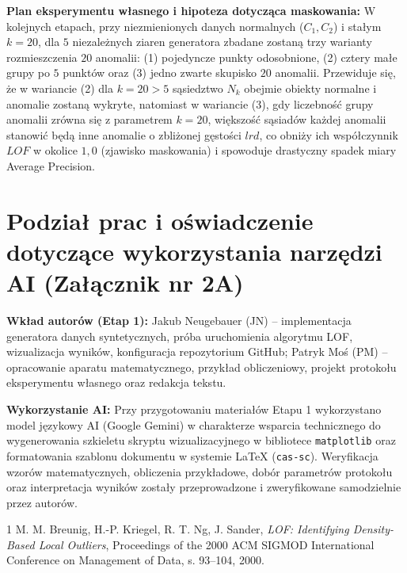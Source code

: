 \documentclass[a4paper,fleqn]{cas-sc}
\begin{document}
\textbf{Plan eksperymentu własnego i hipoteza dotycząca maskowania:} W kolejnych etapach, przy niezmienionych danych normalnych ($C_1, C_2$) i stałym $k=20$, dla $5$ niezależnych ziaren generatora zbadane zostaną trzy warianty rozmieszczenia $20$ anomalii: (1) pojedyncze punkty odosobnione, (2) cztery małe grupy po $5$ punktów oraz (3) jedno zwarte skupisko $20$ anomalii. Przewiduje się, że w wariancie (2) dla $k=20 > 5$ sąsiedztwo $N_k$ obejmie obiekty normalne i anomalie zostaną wykryte, natomiast w wariancie (3), gdy liczebność grupy anomalii zrówna się z parametrem $k=20$, większość sąsiadów każdej anomalii stanowić będą inne anomalie o zbliżonej gęstości $lrd$, co obniży ich współczynnik $LOF$ w okolice $1,0$ (zjawisko maskowania) i spowoduje drastyczny spadek miary Average Precision.

\section*{Podział prac i oświadczenie dotyczące wykorzystania narzędzi AI (Załącznik nr 2A)}
\textbf{Wkład autorów (Etap 1):} Jakub Neugebauer (JN) -- implementacja generatora danych syntetycznych, próba uruchomienia algorytmu LOF, wizualizacja wyników, konfiguracja repozytorium GitHub; Patryk Moś (PM) -- opracowanie aparatu matematycznego, przykład obliczeniowy, projekt protokołu eksperymentu własnego oraz redakcja tekstu.

\textbf{Wykorzystanie AI:} Przy przygotowaniu materiałów Etapu 1 wykorzystano model językowy AI (Google Gemini) w charakterze wsparcia technicznego do wygenerowania szkieletu skryptu wizualizacyjnego w bibliotece \texttt{matplotlib} oraz formatowania szablonu dokumentu w systemie \LaTeX{} (\texttt{cas-sc}). Weryfikacja wzorów matematycznych, obliczenia przykładowe, dobór parametrów protokołu oraz interpretacja wyników zostały przeprowadzone i zweryfikowane samodzielnie przez autorów.

\begin{thebibliography}{1}
M. M. Breunig, H.-P. Kriegel, R. T. Ng, J. Sander, \textit{LOF: Identifying Density-Based Local Outliers}, Proceedings of the 2000 ACM SIGMOD International Conference on Management of Data, s. 93--104, 2000.
\end{thebibliography}
\end{document}
